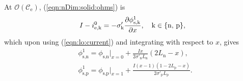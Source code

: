 \documentclass[a4paper]{article}
\newcommand{\ts}[1]{_{\text{#1}}}
\newcommand{\kin}[1]{\text{k} \in \{\text{#1}\}}
\begin{document}
At $\mathcal{O}(\mathcal{C}\ts{e})$, (\ref{eqn:nDim:solid:ohms}) is
\begin{equation}
  I - i\ts{e,k}^0 = -\sigma'\ts{k} \pdv{\phi\ts{s,k}^1}{x}, \quad \kin{n, p},
\end{equation}
which upon using (\ref{eqn:lo:current}) and integrating with respect to $x$, gives 
\begin{subequations}\label{eqn:od-solid-potentials}
\begin{align}
  &\phi\ts{s,n}^1 = \phi\ts{s,n}\big|_{x=0} + \frac{Ix}{2\sigma'\ts{n} L\ts{n}}\left(2L\ts{n} - x\right),\\ 
	&\phi\ts{s,p}^1 = \phi\ts{s,p}\big|_{x=1} + \frac{I (x-1) (1-2L\ts{p}-x)}{2\sigma'\ts{p} L\ts{p}}.
\end{align}
\end{subequations} 
\end{document}
